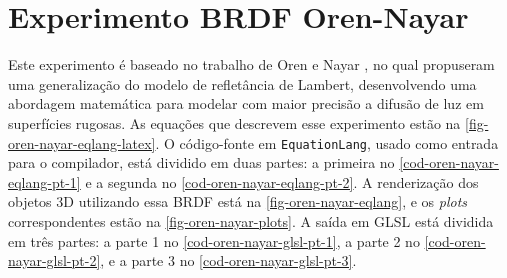 \section{Experimento BRDF Oren-Nayar}

Este experimento é baseado no trabalho de Oren e Nayar \cite{oren1994generalization}, no qual propuseram uma generalização do modelo de refletância de Lambert, desenvolvendo uma abordagem matemática para modelar com maior precisão a difusão de luz em superfícies rugosas. As equações que descrevem esse experimento estão na \autoref{fig-oren-nayar-eqlang-latex}. O código-fonte em \texttt{EquationLang}, usado como entrada para o compilador, está dividido em duas partes: a primeira no \autoref{cod-oren-nayar-eqlang-pt-1} e a segunda no \autoref{cod-oren-nayar-eqlang-pt-2}. A renderização dos objetos 3D utilizando essa BRDF está na \autoref{fig-oren-nayar-eqlang}, e os \textit{plots} correspondentes estão na \autoref{fig-oren-nayar-plots}. A saída em GLSL está dividida em três partes: a parte 1 no \autoref{cod-oren-nayar-glsl-pt-1}, a parte 2 no \autoref{cod-oren-nayar-glsl-pt-2}, e a parte 3 no \autoref{cod-oren-nayar-glsl-pt-3}.


